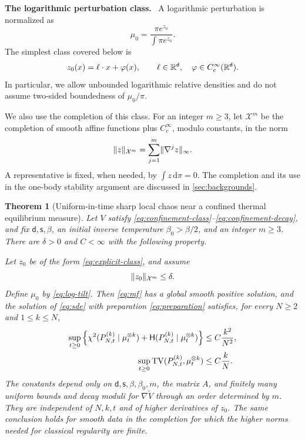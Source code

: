 \documentclass[11pt,reqno]{amsart}
\numberwithin{equation}{section}
\theoremstyle{plain}
\newtheorem{thm}{Theorem}[section]
\theoremstyle{remark}
\DeclarePairedDelimiter{\norm}{\lVert}{\rVert}
\renewcommand{\d}{\mathsf{d}}\newcommand{\s}{\mathsf{s}}
\newcommand{\Hr}{\mathsf H}\newcommand{\dd}{\,\mathrm d}
\newcommand{\parheading}[1]{\par\medskip\noindent\textbf{#1}\ }
\newcommand{\Xspace}{\mathcal X}
\begin{document}
\parheading{The logarithmic perturbation class.}
A logarithmic perturbation is normalized as
\begin{equation}\label{eq:log-tilt}
 \mu_0=\frac{\pi e^{z_0}}{\int\pi e^{z_0}}.
\end{equation}
The simplest class covered below is
\begin{equation}\label{eq:explicit-class}
 z_0(x)=\ell\cdot x+\varphi(x),\qquad
 \ell\in\R^\d,\quad\varphi\in C_c^\infty(\R^\d).
\end{equation}
In particular, we allow unbounded logarithmic relative densities and do not assume two-sided boundedness of $\mu_0/\pi$.

We also use the completion of this class. For an integer $m\ge3$, let $\Xspace^m$ be the completion of smooth affine functions plus $C_c^\infty$, modulo constants, in the norm
\begin{equation}\label{eq:X-norm}
 \norm z_{\Xspace^m}=\sum_{j=1}^m\norm{\nabla^jz}_\infty.
\end{equation}
A representative is fixed, when needed, by $\int z\dd\pi=0$. The completion and its use in the one-body stability argument are discussed in \cref{sec:backgrounds}.

\begin{thm}[Uniform-in-time sharp local chaos near a confined thermal equilibrium measure]\label{thm:uniform}
Let $V$ satisfy \eqref{eq:confinement-class}--\eqref{eq:confinement-decay}, and fix $\d,\s,\beta$, an initial inverse temperature $\beta_0>\beta/2$, and an integer $m\ge3$. There are $\delta>0$ and $C<\infty$ with the following property.


Let $z_0$ be of the form \eqref{eq:explicit-class}, and assume
\begin{equation}\label{eq:intro-small-perturbation}
 \norm{z_0}_{\Xspace^m}\le\delta.
\end{equation}
Define $\mu_0$ by \eqref{eq:log-tilt}. Then \eqref{eq:mf} has a global smooth positive solution, and the solution of \eqref{eq:sde} with preparation \eqref{eq:preparation} satisfies, for every $N\ge2$ and $1\le k\le N$,
\begin{align}
 \sup_{t\ge0}\left\{\chi^2(P_{N,t}^{(k)}\mid\mu_t^{\otimes k})+
              \Hr(P_{N,t}^{(k)}\mid\mu_t^{\otimes k})\right\}
       &\le C\frac{k^2}{N^2},\label{eq:main-rates}\\
 \sup_{t\ge0}\TV(P_{N,t}^{(k)},\mu_t^{\otimes k})
       &\le C\frac{k}{N}.\label{eq:intro-uniform-TV}
\end{align}
The constants depend only on $\d,\s,\beta,\beta_0,m$, the matrix $A$, and finitely many uniform bounds and decay moduli for $\nabla\widetilde V$ through an order determined by $m$. They are independent of $N,k,t$ and of higher derivatives of $z_0$. The same conclusion holds for smooth data in the completion for which the higher norms needed for classical regularity are finite.
\end{thm}
\end{document}
